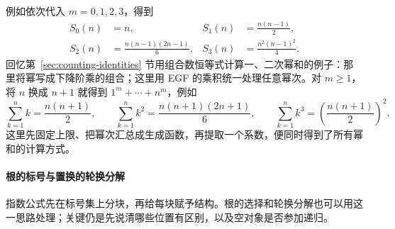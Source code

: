 \documentclass[lang=cn,a4paper,fontset=none,zihao=false,10pt,openany,twoside]{beautybook}
\numberwithin{algorithm}{chapter}
\begin{document}
例如依次代入 $m=0,1,2,3$，得到
\[
 \begin{aligned}
 S_0(n)&=n,&
 S_1(n)&=\frac{n(n-1)}2,\\
 S_2(n)&=\frac{n(n-1)(2n-1)}6,&
 S_3(n)&=\frac{n^2(n-1)^2}4.
 \end{aligned}
\]
回忆第~\ref{sec:counting-identities} 节用组合数恒等式计算一、二次幂和的例子：那里将幂写成下降阶乘的组合；这里用 EGF 的乘积统一处理任意幂次。对 $m\ge1$，将 $n$ 换成 $n+1$ 就得到 $1^m+\cdots+n^m$，例如
\[
 \sum_{k=1}^nk=\frac{n(n+1)}2,\qquad
 \sum_{k=1}^nk^2=\frac{n(n+1)(2n+1)}6,\qquad
 \sum_{k=1}^nk^3=\left(\frac{n(n+1)}2\right)^2.
\]
这里先固定上限、把幂次汇总成生成函数，再提取一个系数，便同时得到了所有幂和的计算方式。


\paragraph{根的标号与置换的轮换分解}
指数公式先在标号集上分块，再给每块赋予结构。根的选择和轮换分解也可以用这一思路处理；关键仍是先说清哪些位置有区别，以及空对象是否参加递归。
\end{document}
